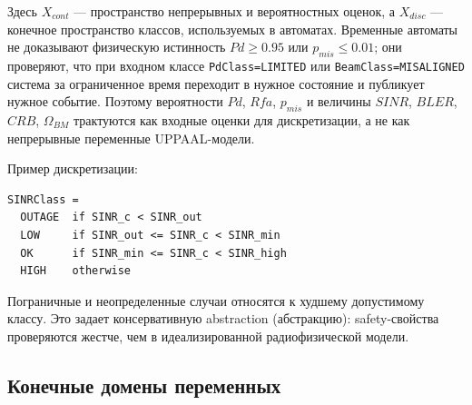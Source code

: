 \documentclass[12pt,a4paper]{article}
\begin{document}
Здесь $X_{cont}$ --- пространство непрерывных и вероятностных оценок, а $X_{disc}$ --- конечное пространство классов, используемых в автоматах. Временные автоматы не доказывают физическую истинность $Pd \ge 0.95$ или $p_{mis}\le 0.01$; они проверяют, что при входном классе \texttt{PdClass=LIMITED} или \texttt{BeamClass=MISALIGNED} система за ограниченное время переходит в нужное состояние и публикует нужное событие. Поэтому вероятности $Pd$, $Rfa$, $p_{mis}$ и величины $SINR$, $BLER$, $CRB$, $\Omega_{BM}$ трактуются как входные оценки для дискретизации, а не как непрерывные переменные UPPAAL-модели.

Пример дискретизации:

\begin{verbatim}
SINRClass =
  OUTAGE  if SINR_c < SINR_out
  LOW     if SINR_out <= SINR_c < SINR_min
  OK      if SINR_min <= SINR_c < SINR_high
  HIGH    otherwise
\end{verbatim}

Пограничные и неопределенные случаи относятся к худшему допустимому классу. Это задает консервативную abstraction (абстракцию): safety-свойства проверяются жестче, чем в идеализированной радиофизической модели.

\subsection{Конечные домены переменных}
\end{document}
